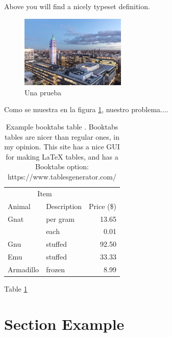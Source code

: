 

Above you will find a nicely typeset definition.

\begin{figure}
    \centering
    \includegraphics[width=5cm]{img/imperial.jpg}
    \caption{Una prueba}
    \label{fig:intro}
\end{figure}

Como se muestra en la figura \ref{fig:intro}, nuestro problema....

\begin{table}
    \centering
    \begin{tabular}{llr}  
        \toprule
        \multicolumn{2}{c}{Item} \\
        \cmidrule(r){1-2}
        Animal    & Description & Price (\$) \\
        \midrule
        Gnat      & per gram    & 13.65      \\
                  &    each     & 0.01       \\
        Gnu       & stuffed     & 92.50      \\
        Emu       & stuffed     & 33.33      \\
        Armadillo & frozen      & 8.99       \\
        \bottomrule
    \end{tabular}
    \caption{Example booktabs table \cite{ramzan2019noSQLsecure}. Booktabs tables are nicer than regular ones, in my opinion. This site has a nice GUI for making LaTeX tables, and has a Booktabs option: https://www.tablesgenerator.com/}
    \label{tab:my_label}
\end{table}

\lipsum[1-4] Table \ref{tab:my_label}

\section{Section Example}
\lipsum[1]
